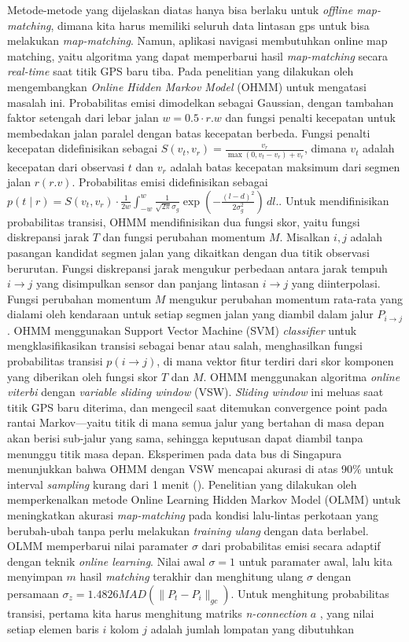 Metode-metode yang dijelaskan diatas hanya bisa berlaku untuk \textit{offline map-matching}, dimana kita harus memiliki seluruh data lintasan gps untuk bisa melakukan \textit{map-matching}. Namun, aplikasi navigasi membutuhkan online map matching, yaitu algoritma yang dapat memperbarui hasil \textit{map-matching} secara \textit{real-time} saat titik GPS baru tiba. Pada penelitian yang dilakukan oleh \cite{Goh2012} mengembangkan \textit{Online Hidden Markov Model} (OHMM) untuk mengatasi masalah ini. Probabilitas emisi dimodelkan sebagai Gaussian, dengan tambahan faktor setengah dari lebar jalan $w=0.5 \cdot r.w$ dan fungsi penalti kecepatan untuk membedakan jalan paralel dengan batas kecepatan berbeda. Fungsi penalti kecepatan didefinisikan sebagai $S(v_t,v_r)=\frac{v_r}{\max (0,v_t-v_r)+v_r}$, dimana $v_t$ adalah kecepatan dari observasi $t$ dan $v_r$ adalah batas kecepatan maksimum dari segmen jalan $r (r.v)$. Probabilitas emisi didefinisikan sebagai $p(t\mid r)=S(v_t,v_r) \cdot \frac{1}{2w} \int_{-w}^{w} \frac{1}{\sqrt{2\pi}\sigma_g} \exp\left( -\frac{(l - d)^2}{2\sigma_g^2} \right) \, dl.$. Untuk mendifinisikan probabilitas transisi, OHMM mendifinisikan dua fungsi skor, yaitu fungsi diskrepansi jarak $T$ dan fungsi perubahan momentum $M$. Misalkan $i,j$ adalah pasangan kandidat segmen jalan yang dikaitkan dengan dua titik observasi berurutan. Fungsi diskrepansi jarak mengukur perbedaan antara jarak tempuh  $i\rightarrow j$  yang disimpulkan sensor dan panjang lintasan $i\rightarrow j$ yang diinterpolasi. Fungsi perubahan momentum $M$ mengukur perubahan momentum rata-rata yang dialami oleh kendaraan untuk setiap segmen jalan yang diambil dalam jalur $P_{i\rightarrow j}$. OHMM menggunakan Support Vector Machine (SVM) \textit{classifier} untuk mengklasifikasikan transisi sebagai benar atau salah, menghasilkan fungsi probabilitas transisi $p(i\rightarrow j)$, di mana vektor fitur terdiri dari skor komponen yang diberikan oleh fungsi skor $T$ dan $M$. OHMM menggunakan algoritma \textit{online viterbi} dengan \textit{variable sliding window} (VSW). \textit{Sliding window} ini meluas saat titik GPS baru diterima, dan mengecil saat ditemukan convergence point pada rantai Markov—yaitu titik di mana semua jalur yang bertahan di masa depan akan berisi sub-jalur yang sama, sehingga keputusan dapat diambil tanpa menunggu titik masa depan. Eksperimen pada data bus di Singapura menunjukkan bahwa OHMM dengan VSW mencapai akurasi di atas 90\% untuk interval \textit{sampling} kurang dari 1 menit (\cite{Goh2012}). Penelitian yang dilakukan oleh \cite{Liang2016} memperkenalkan metode Online Learning Hidden Markov Model (OLMM) untuk meningkatkan akurasi \textit{map-matching} pada kondisi lalu-lintas perkotaan yang berubah-ubah tanpa perlu melakukan \textit{training ulang} dengan data berlabel. OLMM memperbarui nilai paramater $\sigma$ dari probabilitas emisi secara adaptif dengan teknik \textit{online learning}. Nilai awal $\sigma=1$ untuk paramater awal, lalu kita menyimpan $m$ hasil \textit{matching} terakhir dan menghitung ulang $\sigma$ dengan persamaan $\sigma_z=1.4826MAD(\lVert P_t-P_i\rVert_{gc})$. Untuk menghitung probabilitas transisi, pertama kita harus menghitung  matriks \textit{n-connection} $a$ , yang nilai setiap elemen baris $i$ kolom $j$ adalah jumlah lompatan yang dibutuhkan 